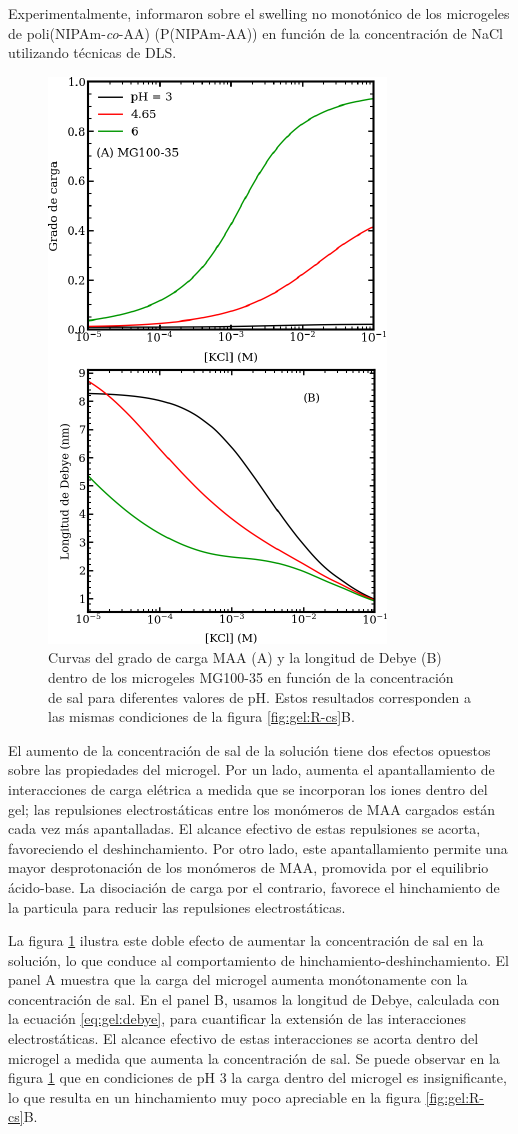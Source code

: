 Experimentalmente, \citet{CaprilesGonzalez2008} informaron sobre el swelling no monot\'onico de los microgeles de poli(NIPAm-\emph{co}-AA) (P(NIPAm-AA)) en funci\'on de la concentraci\'on de NaCl utilizando t\'ecnicas de DLS.




\begin{figure}[!tb]
	\centering
	\includegraphics[width=0.40\linewidth]{Figures/graph-gel/f-cs.pdf}
	\caption{Curvas del grado de carga MAA (A) y la longitud de Debye (B) dentro de los microgeles MG100-35 en funci\'on de la concentraci\'on de sal para diferentes valores de pH.
		Estos resultados corresponden a las mismas condiciones de la figura \ref{fig:gel:R-cs}B.}
	\label{fig:gel:f-cs}
\end{figure}

El aumento de la concentraci\'on de sal de la soluci\'on tiene dos efectos opuestos sobre las propiedades del microgel. Por un lado, aumenta el apantallamiento de interacciones de carga el\'etrica a medida que se incorporan los iones dentro del gel; las repulsiones electrost\'aticas entre los mon\'omeros de MAA cargados est\'an cada vez m\'as apantalladas. El alcance efectivo de estas repulsiones se acorta, favoreciendo el deshinchamiento. Por otro lado, este apantallamiento permite una mayor desprotonaci\'on de los mon\'omeros de MAA, promovida por el equilibrio \'acido-base. La disociaci\'on de carga por el contrario, favorece el hinchamiento de la particula para reducir las repulsiones electrost\'aticas.

La figura \ref{fig:gel:f-cs} ilustra este doble efecto de aumentar la concentraci\'on de sal en la soluci\'on, lo que conduce al comportamiento de hinchamiento-deshinchamiento. El panel A muestra que la carga del microgel aumenta mon\'otonamente con la concentraci\'on de sal. En el panel B, usamos la longitud de Debye, calculada con la ecuaci\'on \ref{eq:gel:debye}, para cuantificar la extensi\'on de las interacciones electrost\'aticas. El alcance efectivo de estas interacciones se acorta dentro del microgel a medida que aumenta la concentraci\'on de sal. Se puede observar en la figura \ref{fig:gel:f-cs} que en condiciones de pH 3 la carga dentro del microgel es insignificante, lo que resulta en un hinchamiento muy poco apreciable en la figura \ref{fig:gel:R-cs}B.

